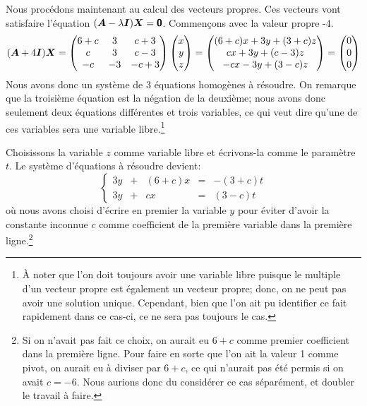 Nous procédons maintenant au calcul des vecteurs propres. Ces vecteurs vont satisfaire 
l'équation $(\boldsymbol{A} -\lambda\boldsymbol{I})\boldsymbol{X} = \mbox{\textsf{\textbf{{0}}}}$. Commençons avec la valeur propre -4.
\[
(\boldsymbol{A} + 4\boldsymbol{I})\boldsymbol{X} = \begin{pmatrix}
6+c & 3 & c+3 \\
c & 3 & c-3 \\
-c & -3 & -c+3
\end{pmatrix}\begin{pmatrix}
x \\ y \\ z
\end{pmatrix}
=
\begin{pmatrix}
(6+c)x + 3y + (3+c) z \\
cx + 3y + (c-3) z \\
-cx -3y + (3-c)z
\end{pmatrix}
=
\begin{pmatrix}
0\\ 0\\ 0
\end{pmatrix}
\]
Nous avons donc un système de 3 équations homogènes à résoudre.  On remarque que la
troisième équation est la négation de la deuxième; nous avons donc seulement deux
équations différentes et trois variables, ce qui veut dire qu'une de ces variables
sera une variable libre.\footnote{À noter que l'on doit toujours avoir une
variable libre puisque le multiple d'un vecteur propre est également un vecteur
propre; donc, on ne peut pas avoir une solution unique. Cependant, bien que l'on
ait pu identifier ce fait rapidement dans ce cas-ci, ce ne sera
pas toujours le cas.}

  Choisissons la variable $z$ comme variable libre
et écrivons-la comme le paramètre $t$.  Le système d'équations à résoudre devient:
\[
\left\{
\begin{matrix}
3y &+& (6+c)x  &=& -(3+c)t \\
3y &+& cx &=& (3-c)t
\end{matrix}
\right.
\]
où nous avons choisi d'écrire en premier la variable $y$ pour éviter d'avoir
la constante inconnue $c$ comme coefficient de la première variable 
dans la première ligne.\footnote{Si on n'avait pas fait ce choix, on aurait eu $6+c$
comme premier coefficient dans la première ligne.  Pour faire en sorte que l'on
ait la valeur 1 comme pivot, on aurait eu à diviser par $6+c$, ce qui n'aurait pas 
été permis si on avait $c=-6$. Nous aurions donc du considérer ce cas séparément,
et doubler le travail à faire.}

